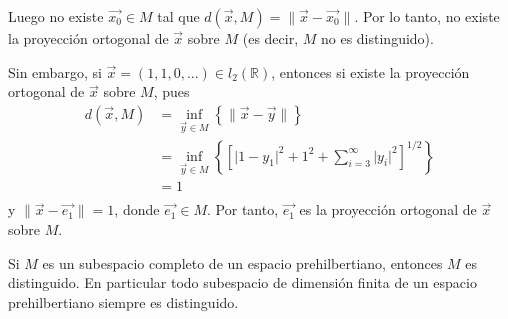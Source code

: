 \documentclass[12pt]{report}
\newcounter{it}
\theoremstyle{largebreak}
\newcommand\abs[1]{\ensuremath{\big|#1\big|}}
\newcommand\norm[1]{\ensuremath{\|#1\|}}
\begin{document}
\begin{exa}
        Luego no existe $\vec{x_0}\in M$ tal que $d(\vec{x},M)=\norm{\vec{x}-\vec{x_0}}$. Por lo tanto, no existe la proyección ortogonal de $\vec{x}$ sobre $M$ (es decir, $M$ no es distinguido).

        Sin embargo, si $\vec{x}=(1,1,0,...)\in l_2(\mathbb{R})$, entonces si existe la proyección ortogonal de $\vec{x}$ sobre $M$, pues
        \begin{equation*}
            \begin{split}
                d(\vec{x},M)&=\inf_{\vec{y}\in M}\left\{\norm{\vec{x}-\vec{y}} \right\}\\
                &=\inf_{\vec{y}\in M}\left\{\left[\abs{1-y_1}^2+1^2+\sum_{i=3}^{\infty} \abs{y_i}^2 \right]^{1/2} \right\}\\
                &=1\\
            \end{split}
        \end{equation*}
        y $\norm{\vec{x}-\vec{e_1}}=1$, donde $\vec{e_1}\in M$. Por tanto, $\vec{e_1}$ es la proyección ortogonal de $\vec{x}$ sobre $M$.
    \end{exa}

    \begin{theor}
        Si $M$ es un subespacio completo de un espacio prehilbertiano, entonces $M$ es distinguido. En particular todo subespacio de dimensión finita de un espacio prehilbertiano siempre es distinguido. 
    \end{theor}
\end{document}
